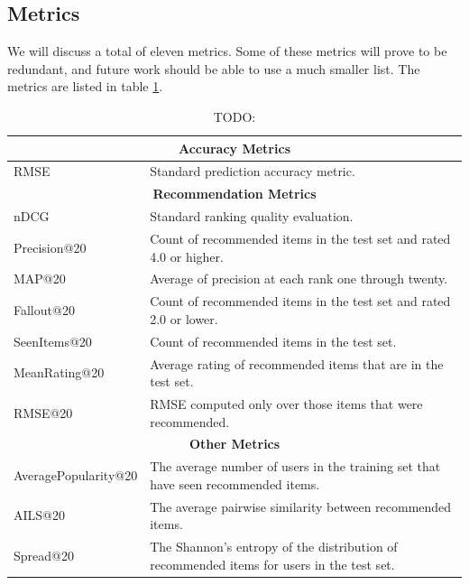 \documentclass[letterpaper]{sig-alternate}
\begin{document}
  \subsection*{Metrics}
  We will discuss a total of eleven metrics.
  Some of these metrics will prove to be redundant, and future work should be able to use a much smaller list.
  The metrics are listed in table \ref{tbl:metrics}.
  \begin{table}[ht!]
    \centering
    \begin{tabular}{|p{7em}|p{16em}|}
      \hline
      \multicolumn{2}{|c|}{{\bf Accuracy Metrics}} \\\hline
      RMSE                   & Standard prediction accuracy metric. \\\hline
      \hline
      \multicolumn{2}{|c|}{{\bf Recommendation Metrics}} \\\hline
      nDCG                   & Standard ranking quality evaluation.\\\hline
      Precision@20           & Count of recommended items in the test set and rated 4.0 or higher.\\\hline
      MAP@20                 & Average of precision at each rank one through twenty.\\\hline
      Fallout@20             & Count of recommended items in the test set and rated 2.0 or lower.\\\hline
      SeenItems@20           & Count of recommended items in the test set.\\\hline
      MeanRating@20          & Average rating of recommended items that are in the test set.\\\hline
      RMSE@20                & RMSE computed only over those items that were recommended.\\\hline
      \hline
      \multicolumn{2}{|c|}{{\bf Other Metrics}} \\\hline
      Average\-Popularity@20 & The average number of users in the training set that have seen recommended items.\\\hline
      AILS@20                & The average pairwise similarity between recommended items. \\\hline
      Spread@20              & The Shannon's entropy of the distribution of recommended items for users in the test set.\\\hline
    \end{tabular}
    \caption{TODO:}
    \label{tbl:metrics}
  \end{table}
  
\end{document}
